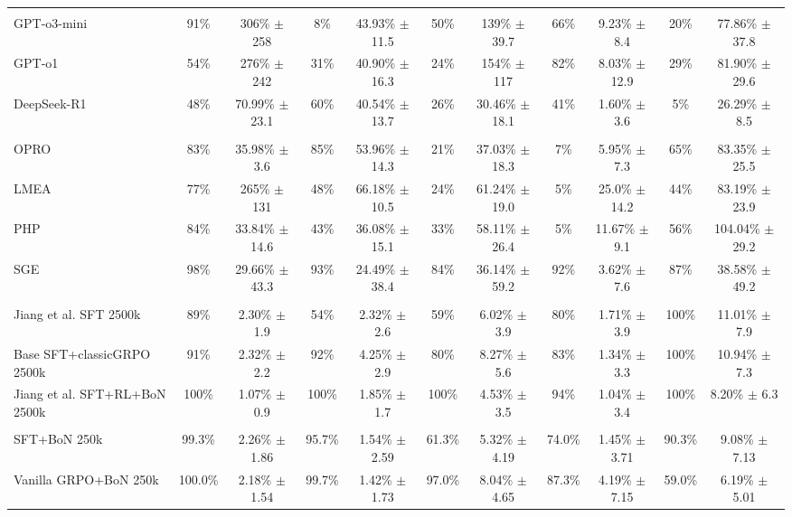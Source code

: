 \documentclass{article}
\theoremstyle{remark}
\begin{document}
\begin{table}[t]
{\begin{tabular}{lcccccccccc}
\addlinespace[2pt]
\multicolumn{11}{l}{\textbf{Reasoning Models}} \\
GPT-o3-mini & 91\% & 306\% $\pm$ 258 & 8\% & 43.93\% $\pm$ 11.5 & 50\% & 139\% $\pm$ 39.7 & 66\% & 9.23\% $\pm$ 8.4 & 20\% & 77.86\% $\pm$ 37.8 \\
GPT-o1 & 54\% & 276\% $\pm$ 242 & 31\% & 40.90\% $\pm$ 16.3 & 24\% & 154\% $\pm$ 117 & 82\% & 8.03\% $\pm$ 12.9 & 29\% & 81.90\% $\pm$ 29.6 \\
DeepSeek-R1 & 48\% & 70.99\% $\pm$ 23.1 & 60\% & 40.54\% $\pm$ 13.7 & 26\% & 30.46\% $\pm$ 18.1 & 41\% & 1.60\% $\pm$ 3.6 & 5\% & 26.29\% $\pm$ 8.5 \\
\addlinespace[2pt]
\multicolumn{11}{l}{\textbf{Prompt Strategies}} \\
OPRO & 83\% & 35.98\% $\pm$ 3.6 & 85\% & 53.96\% $\pm$ 14.3 & 21\% & 37.03\% $\pm$ 18.3 & 7\% & 5.95\% $\pm$ 7.3 & 65\% & 83.35\% $\pm$ 25.5 \\
LMEA & 77\% & 265\% $\pm$ 131 & 48\% & 66.18\% $\pm$ 10.5 & 24\% & 61.24\% $\pm$ 19.0 & 5\% & 25.0\% $\pm$ 14.2 & 44\% & 83.19\% $\pm$ 23.9 \\
PHP & 84\% & 33.84\% $\pm$ 14.6 & 43\% & 36.08\% $\pm$ 15.1 & 33\% & 58.11\% $\pm$ 26.4 & 5\% & 11.67\% $\pm$ 9.1 & 56\% & 104.04\% $\pm$ 29.2 \\
SGE & 98\% & 29.66\% $\pm$ 43.3 & 93\% & 24.49\% $\pm$ 38.4 & 84\% & 36.14\% $\pm$ 59.2 & 92\% & 3.62\% $\pm$ 7.6 & 87\% & 38.58\% $\pm$ 49.2 \\
\addlinespace[2pt]
\multicolumn{11}{l}{\textbf{Base paper (Jiang et al.)}} \\
Jiang et al. SFT 2500k & 89\% & 2.30\% $\pm$ 1.9 & 54\% & 2.32\% $\pm$ 2.6 & 59\% & 6.02\% $\pm$ 3.9 & 80\% & 1.71\% $\pm$ 3.9 & 100\% & 11.01\% $\pm$ 7.9 \\
Base SFT+classicGRPO 2500k & 91\% & 2.32\% $\pm$ 2.2 & 92\% & 4.25\% $\pm$ 2.9 & 80\% & 8.27\% $\pm$ 5.6 & 83\% & 1.34\% $\pm$ 3.3 & 100\% & 10.94\% $\pm$ 7.3 \\
Jiang et al. SFT+RL+BoN 2500k & 100\% & 1.07\% $\pm$ 0.9 & 100\% & 1.85\% $\pm$ 1.7 & 100\% & 4.53\% $\pm$ 3.5 & 94\% & 1.04\% $\pm$ 3.4 & 100\% & 8.20\% $\pm$ 6.3 \\
\addlinespace[2pt]
\multicolumn{11}{l}{\textbf{This work}} \\
SFT+BoN 250k & 99.3\% & 2.26\% $\pm$ 1.86 & 95.7\% & 1.54\% $\pm$ 2.59 & 61.3\% & 5.32\% $\pm$ 4.19 & 74.0\% & 1.45\% $\pm$ 3.71 & 90.3\% & 9.08\% $\pm$ 7.13 \\
Vanilla GRPO+BoN 250k & 100.0\% & 2.18\% $\pm$ 1.54 & 99.7\% & 1.42\% $\pm$ 1.73 & 97.0\% & 8.04\% $\pm$ 4.65 & 87.3\% & 4.19\% $\pm$ 7.15 & 59.0\% & 6.19\% $\pm$ 5.01 \\

\end{tabular}}
\end{table}
\end{document}
